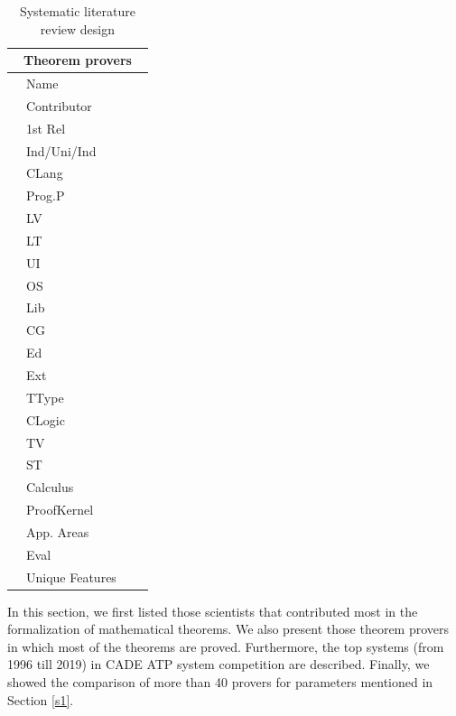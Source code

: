 \begin{table}[!ht]
 \caption{Systematic literature review design}\vspace{-3mm} 
 \centering 
\begin{tabular}{|p{}|p{}|p{2cm}|p{2cm}|}\hline
\multicolumn{4}{|c|}{Theorem provers} \\
\hline
\parbox[t]{2mm}{} & Name & & \\
 & Contributor & & \\
 & 1st Rel & &  \\
 & Ind/Uni/Ind & & \\ \hline
\parbox[t]{2mm}{} & CLang &  &  \\
 & Prog.P & &  \\
 & LV &  &  \\
 & LT &  &  \\
 & UI &  & \\
 & OS &  &  \\
 & Lib & &  \\
 & CG &  & \\
 & Ed &  & \\
 & Ext &  &  \\ \hline
\parbox[t]{2mm}{} & TType & &  \\
 & CLogic &  & \\
 & TV &  & \\
 & ST &  & \\
 & Calculus & & \\
 & ProofKernel &  & \\ \hline
\parbox[t]{2mm}{} & App. Areas & &  \\
 & Eval &  &
  \\
& Unique Features & &
 \\
\hline
\end{tabular}
\label{slrl}
\end{table}

\label{s5}
In this section, we first listed those scientists that contributed most in the formalization of mathematical theorems. 
We also present those theorem provers in which most of the theorems are proved. Furthermore, the top systems 
(from 1996 till 2019) in CADE ATP system competition are described. Finally, we showed the comparison of more than 40 provers for 
parameters mentioned in Section \ref{s1}.


